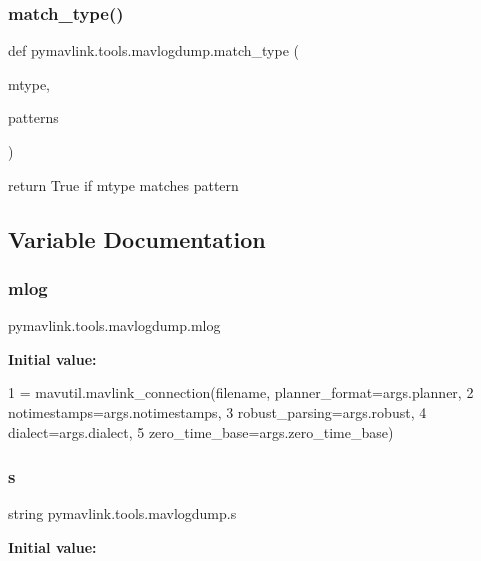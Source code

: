 \subsubsection{\texorpdfstring{match\+\_\+type()}{match\_type()}}
{\footnotesize\ttfamily def pymavlink.\+tools.\+mavlogdump.\+match\+\_\+type (\begin{DoxyParamCaption}\item[{}]{mtype,  }\item[{}]{patterns }\end{DoxyParamCaption})}

\begin{DoxyVerb}return True if mtype matches pattern\end{DoxyVerb}
 

\subsection{Variable Documentation}
\mbox{\label{namespacepymavlink_1_1tools_1_1mavlogdump_a6cff93efb07e41fc83d0590b1c6d2da7}} 
\subsubsection{\texorpdfstring{mlog}{mlog}}
{\footnotesize\ttfamily pymavlink.\+tools.\+mavlogdump.\+mlog}

{\bfseries Initial value\+:}
\begin{DoxyCode}
1 =  mavutil.mavlink\_connection(filename, planner\_format=args.planner,
2                                   notimestamps=args.notimestamps,
3                                   robust\_parsing=args.robust,
4                                   dialect=args.dialect,
5                                   zero\_time\_base=args.zero\_time\_base)
\end{DoxyCode}
\mbox{\label{namespacepymavlink_1_1tools_1_1mavlogdump_a627870b1439e6436d74da8547ae782a6}} 
\subsubsection{\texorpdfstring{s}{s}}
{\footnotesize\ttfamily string pymavlink.\+tools.\+mavlogdump.\+s}

{\bfseries Initial value\+:}
